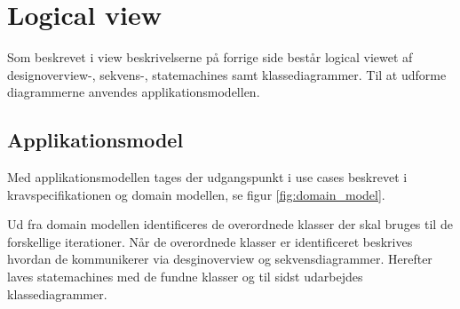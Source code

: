 \section{Logical view}

Som beskrevet i view beskrivelserne på forrige side består logical viewet af designoverview-, sekvens-, statemachines samt klassediagrammer. Til at udforme diagrammerne anvendes applikationsmodellen.

\subsection{Applikationsmodel}
Med applikationsmodellen tages der udgangspunkt i use cases beskrevet i kravspecifikationen og domain modellen, se figur \ref{fig:domain_model}.
  
Ud fra domain modellen identificeres de overordnede klasser der skal bruges til de forskellige iterationer. Når de overordnede klasser er identificeret beskrives hvordan de kommunikerer via desginoverview og sekvensdiagrammer. Herefter laves statemachines med de fundne klasser og til sidst udarbejdes klassediagrammer.









